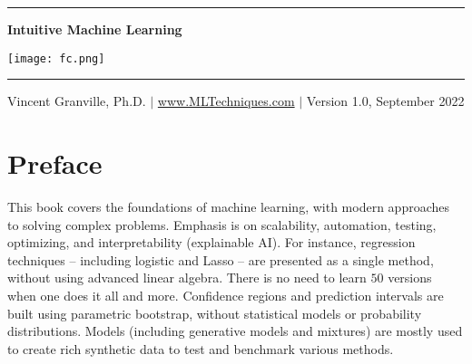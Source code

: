 \documentclass[oneside,10pt]{book}
\begin{document}
\hypersetup{linkcolor=blue}



\baselineskip
\thispagestyle{empty}
\hspace{0pt}
\vfill
\begin{center}
\rule{0.75\textwidth}{.4pt}
\end{center}

\begin{center}
{\Huge \bf{Intuitive Machine Learning} }  
\end{center}


\baselineskip
\addvspace{1cm}
\begin{center}
\texttt{[image: fc.png]}  
\end{center}
\addvspace{1cm}
\begin{center}
\rule{0.75\textwidth}{.4pt}
\end{center}
\begin{center}
Vincent Granville, Ph.D. $|$ \href{https://mltechniques.com/}{www.MLTechniques.com} $|$ Version 1.0, September 2022 
\end{center}

\hypersetup{linkcolor=red} %

\vfill
\hspace{0pt}
\pagebreak

\chapter*{Preface} %

This book covers the foundations of machine learning, with modern approaches to solving complex problems. Emphasis is on scalability, automation, testing, optimizing, and interpretability (explainable AI). For instance, regression techniques -- including logistic and Lasso -- are presented as a single method, without using advanced linear algebra. There is no need to learn $50$ versions when one does it all and more. Confidence regions and prediction intervals are built using parametric bootstrap, without statistical models or probability distributions. Models (including generative models and mixtures) are mostly used to create rich synthetic data to test and benchmark various methods.
\end{document}
